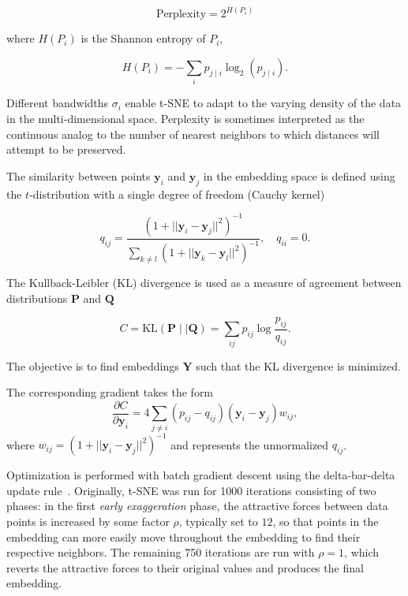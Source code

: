 \documentclass[twocolumn]{bmcart}
\begin{document}
\begin{equation}
\text{Perplexity} = 2^{H(P_i)}
\end{equation}

\noindent where $H(P_i)$ is the Shannon entropy of $P_i$,

\begin{equation}
H(P_i) = -\sum_i p_{j \mid i} \log_2 (p_{j \mid i}).
\end{equation}

\noindent Different bandwidths $\sigma_i$ enable t-SNE to adapt to the varying
density of the data in the multi-dimensional space. Perplexity is sometimes
interpreted as the continuous analog to the number of nearest neighbors to which
distances will attempt to be preserved. 

The similarity between points $\mathbf{y}_i$ and $\mathbf{y}_j$ in the
embedding space is defined using the $t$-distribution with a single degree of
freedom (Cauchy kernel)

\begin{equation}
q_{ij} = \frac{\left ( 1 + || \mathbf{y}_i - \mathbf{y}_j ||^2 \right )^{-1}}
{\sum_{k \neq l}\left ( 1 + || \mathbf{y}_k - \mathbf{y}_l ||^2 \right )^{-1}},
\quad q_{ii} = 0.
\label{eq:cauchy_kernel}
\end{equation}

The Kullback-Leibler (KL) divergence is used as a measure of agreement
between distributions $\mathbf{P}$ and $\mathbf{Q}$

\begin{equation}
C = \text{KL}(\mathbf{P} \mid \mid \mathbf{Q}) = \sum_{ij} p_{ij} \log \frac{p_{ij}}{q_{ij}}.
\label{eq:kl_divergence}
\end{equation}

\noindent The objective is to find embeddings $\mathbf{Y}$ such that the
KL divergence is minimized.

The corresponding gradient takes the form
\begin{equation}
\frac{\partial C}{\partial \mathbf{y}_i} = 4 \sum_{j \neq i} \left ( p_{ij} - q_{ij} \right ) \left ( \mathbf{y}_i - \mathbf{y}_j \right ) w_{ij},
\label{eq:tsne_gradient}
\end{equation}
where $w_{ij} = \left ( 1 + || \mathbf{y}_i - \mathbf{y}_j || ^2 \right )^{-1}$
and represents the unnormalized $q_{ij}$.

Optimization is performed with batch gradient descent using the delta-bar-delta
update rule~\cite{jacobs1988increased}. Originally, t-SNE was run for 1000
iterations consisting of two phases: in the first \textit{early exaggeration}
phase, the attractive forces between data points is increased by some factor
$\rho$, typically set to $12$, so that points in the embedding can more easily move throughout the embedding to find
their respective neighbors. The remaining 750 iterations are run with $\rho=1$,
which reverts the attractive forces to their original values and produces the
final embedding.
\end{document}

